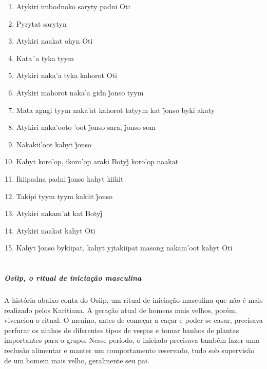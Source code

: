 \begin{enumerate}
 \item Atykiri imbodnoko saryty padni Oti

 \item Pyrytat sarytyn

 \item Atykiri naakat ohyn Oti

 \item Kata´a tyka tyym

 \item Atykiri naka'a tyka kahorot Oti

 \begin{center}\end{center}

 \item Atykiri mahorot naka’a gidn j̃onso tyym

 \item Mata agngi tyym naka’at kahorot tatyym kat j̃onso byki akaty

 \item Atykiri naka’ooto ’oot j̃onso sara, j̃onso som

 \item Nakakii’oot kahyt j̃onso

 \item Kahyt koro’op, ikoro’op araki Botyj̃ koro’op naakat

 \item Ikiipadna padni j̃onso kahyt kiikit

 \item Takipi tyym tyym kakiit j̃onso

 \item Atykiri nakam’at kat Botyj̃

 \item Atykiri naakat kahyt Oti

 \item Kahyt j̃onso bykiipat, kahyt yjtakiipat masong nakam’oot kahyt Oti
 \end{enumerate}

\chapter*{}
\thispagestyle{empty}

\vspace*{\fill}

\paragraph{Osiip, o ritual de iniciação masculina}
 A história abaixo conta do Osiip, um ritual de iniciação masculina que
 não é mais realizado pelos Karitiana. A geração atual de homens mais
 velhos, porém, vivenciou o ritual. O menino, antes de começar a caçar e
 poder se casar, precisava perfurar os ninhos de diferentes tipos de
 vespas e tomar banhos de plantas importantes para o grupo. Nesse
 período, o iniciado precisava também fazer uma reclusão alimentar e
 manter um comportamento reservado, tudo sob supervisão de um homem mais
 velho, geralmente seu pai.

